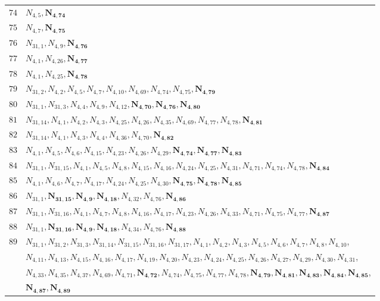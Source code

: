 \documentclass{amsart}
\theoremstyle{plain}
\theoremstyle{definition}
\theoremstyle{remark}
\begin{document}
{\begin{longtable}{ll}
$74$ & $N_{4,5}, \bm{N_{4,74}}$\\
$75$ & $N_{4,7}, \bm{N_{4,75}}$\\
$76$ & $N_{31,1}, N_{4,9}, \bm{N_{4,76}}$\\
$77$ & $N_{4,1}, N_{4,26}, \bm{N_{4,77}}$\\
$78$ & $N_{4,1}, N_{4,25}, \bm{N_{4,78}}$\\
$79$ & $N_{31,2}, N_{4,2}, N_{4,5}, N_{4,7}, N_{4,10}, N_{4,69}, N_{4,74}, N_{4,75}, \bm{N_{4,79}}$\\
$80$ & $N_{31,1}, N_{31,3}, N_{4,4}, N_{4,9}, N_{4,12}, \bm{N_{4,70}}, \bm{N_{4,76}}, \bm{N_{4,80}}$\\
$81$ & $N_{31,14}, N_{4,1}, N_{4,2}, N_{4,3}, N_{4,25}, N_{4,26}, N_{4,35}, N_{4,69}, N_{4,77}, N_{4,78}, \bm{N_{4,81}}$\\
$82$ & $N_{31,14}, N_{4,1}, N_{4,3}, N_{4,4}, N_{4,36}, N_{4,70}, \bm{N_{4,82}}$\\
$83$ & $N_{4,1}, N_{4,5}, N_{4,6}, N_{4,15}, N_{4,23}, N_{4,26}, N_{4,29}, \bm{N_{4,74}}, \bm{N_{4,77}}, \bm{N_{4,83}}$\\
$84$ & $N_{31,1}, N_{31,15}, N_{4,1}, N_{4,5}, N_{4,8}, N_{4,15}, N_{4,16}, N_{4,24}, N_{4,25}, N_{4,31}, N_{4,71}, N_{4,74}, N_{4,78}, \bm{N_{4,84}}$\\
$85$ & $N_{4,1}, N_{4,6}, N_{4,7}, N_{4,17}, N_{4,24}, N_{4,25}, N_{4,30}, \bm{N_{4,75}}, \bm{N_{4,78}}, \bm{N_{4,85}}$\\
$86$ & $N_{31,1}, \bm{N_{31,15}}, \bm{N_{4,9}}, \bm{N_{4,18}}, N_{4,32}, N_{4,76}, \bm{N_{4,86}}$\\
$87$ & $N_{31,1}, N_{31,16}, N_{4,1}, N_{4,7}, N_{4,8}, N_{4,16}, N_{4,17}, N_{4,23}, N_{4,26}, N_{4,33}, N_{4,71}, N_{4,75}, N_{4,77}, \bm{N_{4,87}}$\\
$88$ & $N_{31,1}, \bm{N_{31,16}}, \bm{N_{4,9}}, \bm{N_{4,18}}, N_{4,34}, N_{4,76}, \bm{N_{4,88}}$\\
$89$ & $N_{31,1}, N_{31,2}, N_{31,3}, N_{31,14}, N_{31,15}, N_{31,16}, N_{31,17}, N_{4,1}, N_{4,2}, N_{4,3}, N_{4,5}, N_{4,6}, N_{4,7}, N_{4,8}, N_{4,10}$,\\ 
& $N_{4,11}, N_{4,13}, N_{4,15}, N_{4,16}, N_{4,17}, N_{4,19}, N_{4,20}, N_{4,23}, N_{4,24}, N_{4,25}, N_{4,26}, N_{4,27}, N_{4,29}, N_{4,30}, N_{4,31}$,\\ 
& $N_{4,33}, N_{4,35}, N_{4,37}, N_{4,69}, N_{4,71}, \bm{N_{4,72}}, N_{4,74}, N_{4,75}, N_{4,77}, N_{4,78}, \bm{N_{4,79}}, \bm{N_{4,81}}, \bm{N_{4,83}}, \bm{N_{4,84}}, \bm{N_{4,85}}$,\\ 
& $\bm{N_{4,87}}, \bm{N_{4,89}}$\\

\end{longtable}}
\end{document}
